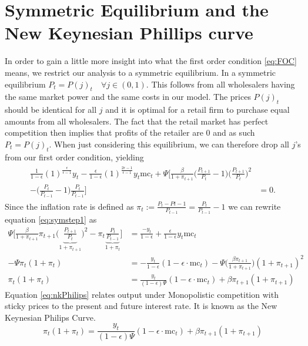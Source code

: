 \documentclass[11pt,a4paper,oneside]{book}
\begin{document}
\section{Symmetric Equilibrium and the New Keynesian Phillips curve}
In order to gain a little more insight into what the first order condition \eqref{eq:FOC} means, we restrict our analysis to a symmetric equilibrium. In a symmetric equilibrium $P_t = P(j)_t\quad \forall j \in (0,1).$ This follows from all wholesalers having the same market power and the same costs in our model. The prices $P(j)_t$ should be identical for all $j$ and it is optimal for a retail firm to purchase equal amounts from all wholesalers. The fact that the retail market has perfect competition then implies that profits of the retailer are $0$ and as such $P_t = P(j)_t$. When just considering this equilibrium, we can therefore drop all $j$'s from our first order condition, yielding
\begin{align}
	\begin{split}
	\frac{1}{1-\epsilon}(1)^{\frac{\epsilon}{\epsilon-1}}y_t - \frac{\epsilon}{1-\epsilon}(1)^{\frac{2\epsilon-1}{\epsilon-1}}y_t\text{mc}_t +\Psi\bigg[\frac{\beta}{1+\pi_{t+1}}\bigg(\frac{P_{t+1}}{P_{t}}-1\bigg)\bigg(\frac{P_{t+1}}{P_t}\bigg)^2&\\- \bigg(\frac{P_t}{P_{t-1}}-1\bigg)\frac{P_{t}}{P_{t-1}}\bigg]&=0.
	\end{split}\label{eq:symstep1}
\end{align}
Since the inflation rate is defined as $\pi_t := \frac{P_{t}-P{t-1}}{P_{t-1}}=\frac{P_t}{P_{t-1}}-1$ we can rewrite equation \eqref{eq:symstep1} as 
\begin{align}
	\Psi\bigg[\frac{\beta}{1+\pi_{t+1}}\pi_{t+1}\bigg(\underbrace{\frac{P_{t+1}}{P_t}}_{1+\pi_{t+1}}\bigg)^2- \pi_t\underbrace{\frac{P_t}{P_{t-1}}}_{1+\pi_t}\bigg]&=\frac{-y_t}{1-\epsilon}+\frac{\epsilon}{1-\epsilon}y_t\text{mc}_t\\
	-\Psi\pi _t(1+\pi_t)&=-\frac{y_t}{1-\epsilon}(1-\epsilon\cdot\text{mc}_t)-\Psi\bigg(\frac{\beta\pi _{t+1}}{1+\pi_{t+1}}\bigg)(1+\pi _{t+1})^2\nonumber\\
	\pi _t(1+\pi_t)&=\frac{y_t}{(1-\epsilon)\Psi}(1-\epsilon\cdot\text{mc}_t)+\beta\pi_{t+1}(1+\pi _{t+1})\label{eq:nkPhilips}
\end{align}
Equation \eqref{eq:nkPhilips} relates output under Monopolistic competition with sticky prices to the present and future interest rate. It is known as the New Keynesian Philips Curve.
\begin{equation*}
	\pi _t(1+\pi_t)=\frac{y_t}{(1-\epsilon)\Psi}(1-\epsilon\cdot\text{mc}_t)+\beta\pi_{t+1}(1+\pi _{t+1})
\end{equation*}
\end{document}
